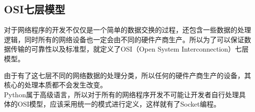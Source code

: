 \vspace{0.5cm}

\subsection{OSI七层模型}

对于网络程序的开发不仅仅是一个简单的数据交换的过程，还包含一些数据的处理逻辑，同时所有的网络设备也一定会由不同的硬件产商生产。所以为了可以保证数据传输的可靠性以及标准型，就定义了OSI（Open System Interconnection）七层模型。

\begin{table}[H]
	\centering
	\caption{OSI七层模型}
\end{table}

由于有了这七层不同的网络数据的处理分类，所以任何的硬件产商生产的设备，其核心的处理本质都不会发生改变。\\

Python属于高级语言，所以对于所有的网络程序开发不可能让开发者自行处理具体的OSI模型，应该采用统一的模式进行定义，这样就有了Socket编程。

